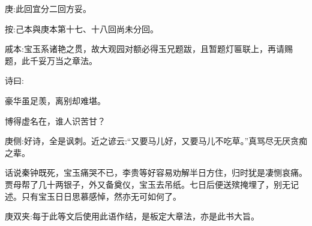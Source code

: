 
\begin{parag}
    \begin{note}庚:此回宜分二回方妥。\end{note}\begin{subnote}按:己本與庚本第十七、十八回尚未分回。\end{subnote}
\end{parag}


\begin{parag}
    \begin{note}戚本:宝玉系诸艳之贯，故大观园对额必得玉兄题跋，且暂题灯匾联上，再请赐题，此千妥万当之章法。\end{note}
\end{parag}


\begin{parag}
    诗曰:
\end{parag}

\begin{poem}
    \begin{pl}豪华虽足羡，离别却难堪。\end{pl}

    \begin{pl}博得虚名在，谁人识苦甘？\end{pl}
    \begin{note}庚侧:好诗，全是讽刺。近之谚云:“又要马儿好，又要马儿不吃草。”真骂尽无厌贪痴之辈。\end{note}
\end{poem}


\begin{parag}
    话说秦钟既死，宝玉痛哭不已，李贵等好容易劝解半日方住，归时犹是凄恻哀痛。贾母帮了几十两银子，外又备奠仪，宝玉去吊纸。七日后便送殡掩埋了，别无记述。只有宝玉日日思慕感悼，然亦无可如何了。\begin{note}庚双夹:每于此等文后使用此语作结，是板定大章法，亦是此书大旨。\end{note}
\end{parag}


